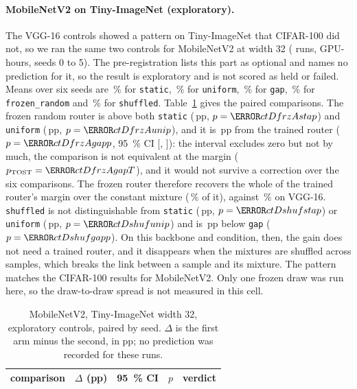 \documentclass[10pt,a4paper]{article}
\begin{document}
\paragraph{MobileNetV2 on Tiny-ImageNet (exploratory).} The VGG-16 controls
showed a pattern on Tiny-ImageNet that CIFAR-100 did not, so we ran the same
two controls for MobileNetV2 at width 32 ( runs, 
GPU-hours, seeds 0 to 5). The pre-registration lists this part as optional and
names no prediction for it, so the result is exploratory and is not scored as
held or failed. Means over six seeds are \,\% for \texttt{static},
\,\% for \texttt{uniform}, \,\% for \texttt{gap},
\,\% for \texttt{frozen\_random} and \,\% for
\texttt{shuffled}. Table~\ref{tab:ctD} gives the paired comparisons. The frozen random
router is above both \texttt{static} (\,pp, $p=\V{ctDfrzAstap}$)
and \texttt{uniform} (\,pp, $p=\V{ctDfrzAunip}$), and it is
\,pp from the trained router ($p=\V{ctDfrzAgapp}$, \SI{95}{\percent} CI
[, ]): the interval excludes zero but not by much,
the comparison is not equivalent at the margin ($p_{\text{TOST}}=\V{ctDfrzAgapT}$), and it
would not survive a correction over the six comparisons. The frozen router
therefore recovers the whole of the trained router's margin over the constant
mixture (\,\% of it), against \,\% on VGG-16.
\texttt{shuffled} is not distinguishable from \texttt{static}
(\,pp, $p=\V{ctDshufstap}$) or \texttt{uniform}
(\,pp, $p=\V{ctDshufunip}$) and is \,pp below
\texttt{gap} ($p=\V{ctDshufgapp}$). On this backbone and condition, then, the gain does not
need a trained router, and it disappears when the mixtures are shuffled
across samples, which breaks the link between a sample and its mixture. The pattern matches the CIFAR-100 results for
MobileNetV2. Only one frozen draw was run here, so the draw-to-draw spread is not measured
in this cell.

\begin{table}[!htbp]\centering\small
\caption{MobileNetV2, Tiny-ImageNet width 32, exploratory controls, paired by
seed. $\Delta$ is the first arm minus the second, in pp; no prediction was
recorded for these runs.}
\label{tab:ctD}
\begin{tabular}{l r l l l}
\toprule
comparison & $\Delta$ (pp) & \SI{95}{\percent} CI & $p$ & verdict \\
\midrule
\bottomrule
\end{tabular}
\end{table}
\end{document}
